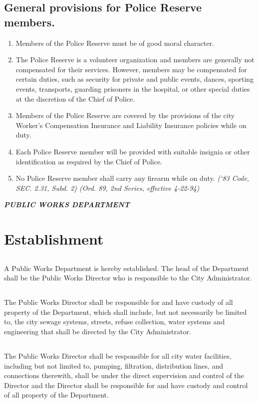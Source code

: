 \subsection{General provisions for Police Reserve members.}
\begin{enumerate}
\item Members of the Police Reserve must be of good moral character.
\item The Police Reserve is a volunteer organization and members are generally not compensated for their services. However, members may be compensated for certain duties, such as security for private and public events, dances, sporting events, transports, guarding prisoners in the hospital, or other special duties at the discretion of the Chief of Police.
\item Members of the Police Reserve are covered by the provisions of the city Worker’s Compensation Insurance and Liability Insurance policies while on duty.
\item Each Police Reserve member will be provided with suitable insignia or other identification as required by the Chief of Police.
\item No Police Reserve member shall carry any firearm while on duty.\newline
\emph{(‘83 Code, SEC. 2.31, Subd. 2)  (Ord. 89, 2nd Series, effective 4-22-94)}
\end{enumerate}

\centerline{\textbf{\emph{\LARGE{PUBLIC WORKS DEPARTMENT}}}}
\setcounter{section}{79}
\section{Establishment}
\subsection{}
A Public Works Department is hereby established.  The head of the Department shall be the Public Works Director who is responsible to the City Administrator.
\subsection{}
The Public Works Director shall be responsible for and have custody of all property of the Department, which shall include, but not necessarily be limited to, the city sewage systems, streets, refuse collection, water systems and engineering that shall be directed by the City Administrator.
\subsection{}
The Public Works Director shall be responsible for all city water facilities, including but not limited to, pumping, filtration, distribution lines, and connections therewith, shall be under the direct supervision and control of the Director and the Director shall be responsible for and have custody and control of all property of the Department.
